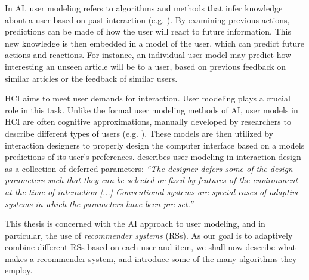 In AI, user modeling refers to algorithms and methods that infer knowledge about a user based on past interaction 
(e.g. \cite{Pazzani2007, Smyth2007, Alshamri2008, Resnick1994}).
By examining previous actions, predictions can be made of how the user will react to future information. This new knowledge is then embedded in a model of the user, which can predict future actions and reactions. 
For instance, an individual user model may predict how interesting an unseen article will be to a user, based on previous feedback on similar articles or the feedback of similar users.

HCI aims to meet user demands for interaction. 
User modeling plays a crucial role in this task. 
Unlike the formal user modeling methods of AI, user models in HCI are often cognitive approximations, manually developed by researchers to describe different types of users 
(e.g. \cite{Fischer2001, Jameson2009, Cato2001}).
These models are then utilized by interaction designers to properly design the computer interface based on a models predictions of its user's preferences.
\cite{Totterdell1990} describes user modeling in interaction design as a collection of deferred parameters: 
\emph{``The designer defers some of the design parameters such that they can be selected or fixed by features of the environment at the time of interaction [...] Conventional systems are special cases of adaptive systems in which the parameters have been pre-set.''}

This thesis is concerned with the AI approach to user modeling, and in particular, the use of \emph{recommender systems} (RSs).
As our goal is to adaptively combine different RSs based on each user and item,
we shall now describe what makes a recommender system, and introduce some of the many algorithms they employ.


